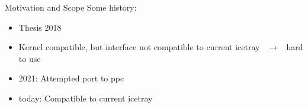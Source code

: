 \begin{frame}[fragile]{Motivation and Scope}
  Some history:
  \begin{itemize}
    \item Thesis 2018
    \item Kernel compatible, but interface not compatible to current icetray \ $\rightarrow$ \ hard to use
    \item 2021: Attempted port to ppc
    \item today: Compatible to current icetray
  \end{itemize}
\end{frame}


%

